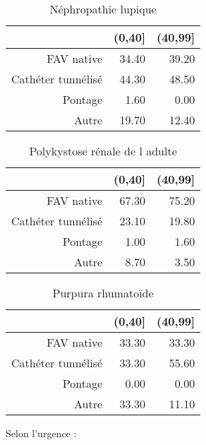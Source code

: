\documentclass[11pt,a4paper]{article}\usepackage[]{graphicx}\usepackage[]{color}
\begin{document}
\begin{table}[H]
\centering
\begin{tabular}{rrr}
  \hline
 & (0,40] & (40,99] \\ 
  \hline
FAV native & 34.40 & 39.20 \\ 
  Cathéter tunnélisé & 44.30 & 48.50 \\ 
  Pontage & 1.60 & 0.00 \\ 
  Autre & 19.70 & 12.40 \\ 
   \hline
\end{tabular}
\caption{Néphropathie lupique} 
\end{table}
\begin{table}[H]
\centering
\begin{tabular}{rrr}
  \hline
 & (0,40] & (40,99] \\ 
  \hline
FAV native & 67.30 & 75.20 \\ 
  Cathéter tunnélisé & 23.10 & 19.80 \\ 
  Pontage & 1.00 & 1.60 \\ 
  Autre & 8.70 & 3.50 \\ 
   \hline
\end{tabular}
\caption{Polykystose rénale de l adulte} 
\end{table}
\begin{table}[H]
\centering
\begin{tabular}{rrr}
  \hline
 & (0,40] & (40,99] \\ 
  \hline
FAV native & 33.30 & 33.30 \\ 
  Cathéter tunnélisé & 33.30 & 55.60 \\ 
  Pontage & 0.00 & 0.00 \\ 
  Autre & 33.30 & 11.10 \\ 
   \hline
\end{tabular}
\caption{Purpura rhumatoïde} 
\end{table}


Selon l'urgence :
\end{document}
